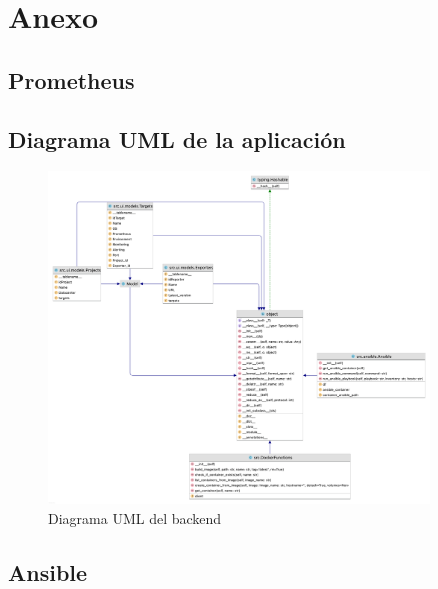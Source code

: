 \chapter*{Anexo}

\section*{Prometheus}
\label{sec:appendix_prometheus}


\section*{Diagrama UML de la aplicación}
\label{sec:appendix_uml}
%
\begin{center}
    \begin{figure}[h]
        \includegraphics[width=0.9\textwidth]{include/desarrollo/src.png}
        \caption{Diagrama UML del backend}
        \label{fig:uml}
    \end{figure}
\end{center}

\section*{Ansible}
\label{sec:appendix_ansible}


